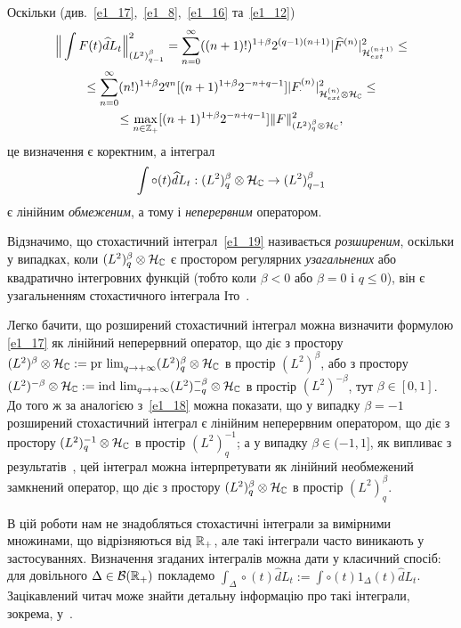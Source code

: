 Оскільки (див.~\eqref{e1_17},~\eqref{e1_8},~\eqref{e1_16} та~\eqref{e1_12})
\begin{equation}\label{e1_18}
\begin{gathered}
\Big\|\int F(t)\widehat d L_t\Big\|_{(L^2)^\beta_{q-1}}^2
=\sum_{n=0}^\infty ((n+1)!)^{1+\beta}2^{(q-1)(n+1)}
|\widehat F^{(n)}|_{\mathcal{H}_{ext}^{(n+1)}}^2\leq\\
\leq\sum_{n=0}^\infty (n!)^{1+\beta}2^{qn}[(n+1)^{1+\beta}2^{-n+q-1}]
|F^{(n)}_\cdot|_{\mathcal{H}_{ext}^{(n)}\otimes\mathcal{H}_{\mathbb{C}}}^2\leq\\
\leq\max\limits_{n\in\mathbb{Z}_+}[(n+1)^{1+\beta}2^{-n+q-1}]
\|F\|_{(L^2)^\beta_q\otimes\mathcal{H}_{\mathbb{C}}}^2,
\end{gathered}
\end{equation}
це визначення є коректним, а інтеграл
\begin{equation}\label{e1_19}
\int\circ (t)\widehat d L_t:
(L^2)^\beta_q\otimes\mathcal{H}_{\mathbb{C}}\to (L^2)^\beta_{q-1}
\end{equation}
є лінійним {\it обмеженим}, а тому і {\it неперервним} оператором.

Відзначимо, що стохастичний інтеграл~\eqref{e1_19} називається {\it розширеним}, оскільки у
випадках, коли $(L^2)^\beta_q\otimes\mathcal{H}_{\mathbb{C}}$ є простором регулярних
{\it узагальнених} або квадратично інтегровних функцій (тобто коли $\beta<0$ або
$\beta=0$ і $q\leq 0$), він є узагальненням стохастичного інтеграла Іто~\cite{K13}.

Легко бачити, що розширений стохастичний інтеграл можна визначити формулою
\eqref{e1_17} як лінійний неперервний оператор, що діє з простору
$(L^2)^\beta\otimes\Hcal_{\bC}
:=\mathop{\rm{pr\ lim}}_{q\to+\infty}(L^2)^\beta_q\otimes\Hcal_{\bC}$
в простір $(L^2)^\beta$, або з простору $(L^2)^{-\beta}\otimes\mathcal{H}_{\mathbb{C}}
:=\mathop{\rm{ind\ lim}}_{q\to+\infty}(L^2)^{-\beta}_{-q}
\otimes\mathcal{H}_{\mathbb{C}}$ в простір $(L^2)^{-\beta}$, тут $\beta\in [0,1]$.
До того ж за аналогією з~\eqref{e1_18} можна показати, що у випадку $\beta=-1$ розширений
стохастичний інтеграл є лінійним неперервним оператором, що діє з простору
$(L^2)^{-1}_q\otimes\mathcal{H}_{\mathbb{C}}$ в простір $(L^2)^{-1}_q$; а у випадку
$\beta\in (-1,1]$, як випливає з результатів~\cite{K13_2}, цей інтеграл можна інтерпретувати
як лінійний необмежений замкнений оператор, що діє з простору
$(L^2)^\beta_q\otimes\mathcal{H}_{\mathbb{C}}$ в простір $(L^2)^\beta_q$.

\begin{subremark}\label{r1_4_1}
В цій роботи нам не знадобляться стохастичні інтеграли за вимірними множинами, що
відрізняються від $\mathbb{R}_+$, але такі інтеграли часто виникають у застосуваннях. Визначення
згаданих інтегралів можна дати у класичний спосіб: для довільного
$\Delta\in\mathcal B(\mathbb{R}_+)$ покладемо
$\int_\Delta\circ (t)\widehat dL_t:=\int\circ (t)1_\Delta (t)\widehat dL_t$. Зацікавлений
читач може знайти детальну інформацію про такі інтеграли, зокрема, у~\cite{K13,K13_2,K21}.
\end{subremark}


